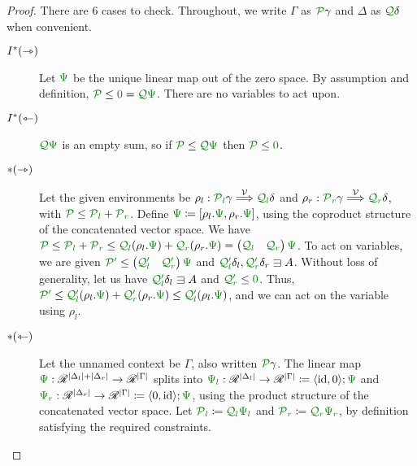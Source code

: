 \begin{proof}
  There are 6 cases to check.
  Throughout, we write $\Gamma$ as $\grP\gamma$ and $\Delta$ as $\grQ\delta$
  when convenient.
  \begin{description}
    \item[$I^{\mathbin{*}}(\rightarrowtriangle)$]
      Let $\gr\Psi$ be the unique linear map out of the zero space.
      By assumption and definition, $\grP \leq \gr0 = \grQ\gr\Psi$.
      There are no variables to act upon.
    \item[$I^{\mathbin{*}}(\leftarrowtriangle)$]
      $\grQ\gr\Psi$ is an empty sum, so if $\grP \leq \grQ\gr\Psi$ then
      $\grP \leq \gr0$.
    \item[$\mathbin{*}(\rightarrowtriangle)$]
      Let the given environments be $\rho_l : \grPl\gamma \env\V \grQl\delta$
      and $\rho_r : \grPr\gamma \env\V \grQr\delta$, with
      $\grP \leq \grPl + \grPr$.
      Define $\gr\Psi \coloneqq [\rho_l.\gr\Psi, \rho_r.\gr\Psi]$, using the
      coproduct structure of the concatenated vector space.
      We have $\grP \leq \grPl + \grPr \leq
      \grQl\plr{\rho_l.\gr\Psi} + \grQr\plr{\rho_r.\gr\Psi} =
      \begin{pmatrix} \grQl & \grQr \end{pmatrix}\gr\Psi$.
      To act on variables, we are given $\grPprime \leq
      \begin{pmatrix} \gr{\grQ'_l} & \gr{\grQ'_r} \end{pmatrix}\gr\Psi$ and
      $\gr{\grQ'_l}\delta_l, \gr{\grQ'_r}\delta_r \sqni A$.
      Without loss of generality, let us have $\gr{\grQ'_l}\delta_l \sqni A$
      and $\gr{\grQ'_r} \leq \gr0$.
      Thus, $\grPprime \leq
      \gr{\grQ'_l}\plr{\rho_l.\gr\Psi} + \gr{\grQ'_r}\plr{\rho_r.\gr\Psi} \leq
      \gr{\grQ'_l}\plr{\rho_l.\gr\Psi}$,
      and we can act on the variable using $\rho_l$.
    \item[$\mathbin{*}(\leftarrowtriangle)$]
      Let the unnamed context be $\Gamma$, also written $\grP\gamma$.
      The linear map
      $\gr\Psi : \Ann^{\size{\Delta_l} + \size{\Delta_r}} \to \Ann^{\size\Gamma}$
      splits into
      $\gr\Psi_{\gr l} : \Ann^{\size{\Delta_l}} \to \Ann^{\size\Gamma}
      \coloneqq \alr{\id, 0}; \gr\Psi$ and
      $\gr\Psi_{\gr r} : \Ann^{\size{\Delta_r}} \to \Ann^{\size\Gamma}
      \coloneqq \alr{0, \id}; \gr\Psi$, using the product structure of
      the concatenated vector space.
      Let $\grPl \coloneqq \grQl\gr\Psi_{\gr l}$ and
      $\grPr \coloneqq \grQr\gr\Psi_{\gr r}$, by definition satisfying the
      required constraints.

\end{description}
\end{proof}
